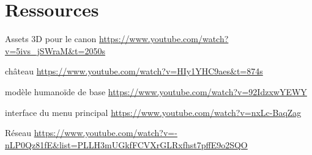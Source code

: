 \documentclass[12pt]{report}
\begin{document}
\chapter{Ressources}

Assets 3D
pour le canon
\url{https://www.youtube.com/watch?v=5ivs_jSWraM&t=2050s}

château
\url{https://www.youtube.com/watch?v=HIy1YHC9aes&t=874s}

modèle humanoïde de base
\url{https://www.youtube.com/watch?v=92IdzxwYEWY}

interface du menu principal
\url{https://www.youtube.com/watch?v=nxLc-BaqZag}

Réseau
\url{https://www.youtube.com/watch?v=-nLP0Qz81fE&list=PLLH3mUGkfFCVXrGLRxfhst7pffE9o2SQO}
\end{document}
